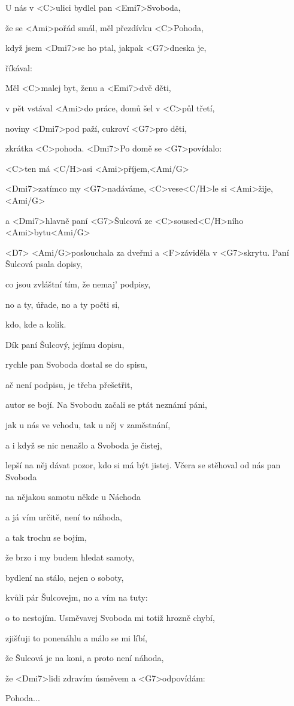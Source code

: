 

\zs
U nás v <C>ulici bydlel pan <Emi7>Svoboda, 

že se <Ami>pořád smál, měl přezdívku <C>Pohoda, 

když jsem <Dmi7>se ho ptal, jakpak <G7>dneska je, 

říkával:  

Měl <C>malej byt, ženu a <Emi7>dvě děti,

v pět vstával <Ami>do práce, domů šel v <C>půl třetí, 

noviny <Dmi7>pod paží, cukroví <G7>pro děti, 

zkrátka <C>pohoda. 
\ks
\zr
<Dmi7>Po domě se <G7>povídalo: 

<C>ten má <C/H>asi <Ami>příjem,<Ami/G> 

<Dmi7>zatímco my <G7>nadáváme, <C>vese<C/H>le si <Ami>žije,<Ami/G>

a <Dmi7>hlavně paní <G7>Šulcová ze <C>soused<C/H>ního <Ami>bytu<Ami/G>

<D7> <Ami/G>poslouchala za dveřmi a <F>záviděla v <G7>skrytu. 
\kr
\zs
Paní Šulcová psala dopisy, 

co jsou zvláštní tím, že nemaj' podpisy, 

no a ty, úřade, no a ty počti si, 

kdo, kde a kolik.

Dík paní Šulcový, jejímu dopisu,

rychle pan Svoboda dostal se do spisu, 

ač není podpisu, je třeba přešetřit, 

autor se bojí. 
\ks
\zr
Na Svobodu začali se ptát neznámí páni, 

jak u nás ve vchodu, tak u něj v zaměstnání, 

a i když se nic nenašlo a Svoboda je čistej, 

lepší na něj dávat pozor, kdo si má být jistej. 
\kr
\zs
Včera se stěhoval od nás pan Svoboda 

na nějakou samotu někde u Náchoda 

a já vím určitě, není to náhoda, 

a tak trochu se bojím, 

že brzo i my budem hledat samoty, 

bydlení na stálo, nejen o soboty, 

kvůli pár Šulcovejm, no a vím na tuty: 

o to nestojím. 
\ks
\zr
Usměvavej Svoboda mi totiž hrozně chybí, 

zjišťuji to ponenáhlu a málo se mi líbí, 

že Šulcová je na koni, a proto není náhoda, 

že <Dmi7>lidi zdravím úsměvem a <G7>odpovídám: 

Pohoda...
\kr
\kp

